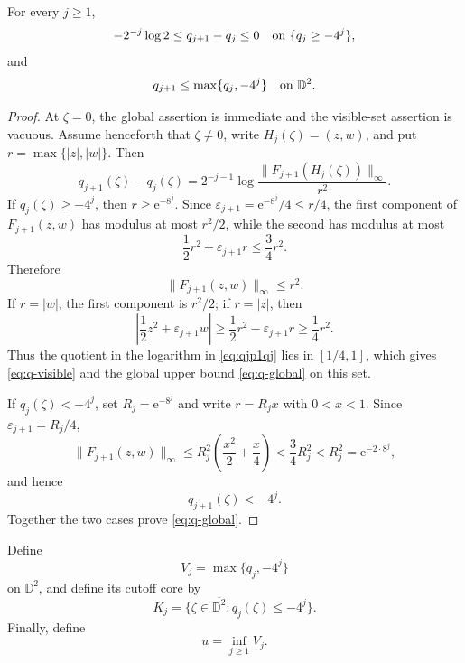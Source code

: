 \documentclass[11pt,a4paper]{article}
\newcommand{\e}{\mathrm e}
\begin{document}
\begin{lemma}
For every $j\ge 1$,
\begin{equation}\label{eq:q-visible}
  -2^{-j}\log 2 \le q_{j+1}-q_j \le 0 \quad\textup{on }\{q_j\ge-4^j\},
\end{equation}
and
\begin{equation}\label{eq:q-global}
  q_{j+1}\le\max\{q_j,-4^j\} \quad\textup{on }\mathbb D^2.
\end{equation}
\end{lemma}

\begin{proof}
At $\zeta=0$, the global assertion is immediate and the visible-set assertion is vacuous. Assume henceforth that $\zeta\ne0$, write $H_j(\zeta)=(z,w)$, and put $r=\max\{|z|,|w|\}$. Then
\begin{equation}\label{eq:qjp1qj}
  q_{j+1}(\zeta)-q_j(\zeta)=2^{-j-1} \log\frac{\|F_{j+1}(H_j(\zeta))\|_\infty}{r^2}.
\end{equation}
If $q_j(\zeta)\ge-4^j$, then $r\ge \e^{-8^j}$. Since $\varepsilon_{j+1}=\e^{-8^j}/4\le r/4$, the first component of $F_{j+1}(z,w)$ has modulus at most $r^2/2$, while the second has modulus at most
\[
  \frac{1}{2}r^2+\varepsilon_{j+1}r
  \le\frac{3}{4}r^2.
\]
Therefore
\[
  \|F_{j+1}(z,w)\|_\infty\le r^2.
\]
If $r=|w|$, the first component is $r^2/2$; if $r=|z|$, then
\[
  \left|\frac{1}{2}z^2+\varepsilon_{j+1}w\right|
  \ge\frac{1}{2}r^2-\varepsilon_{j+1}r
  \ge\frac{1}{4}r^2.
\]
Thus the quotient in the logarithm in \eqref{eq:qjp1qj} lies in $[1/4,1]$, which gives \eqref{eq:q-visible} and the global upper bound \eqref{eq:q-global} on this set.

If $q_j(\zeta)<-4^j$, set $R_j=\e^{-8^j}$ and write $r=R_j x$ with $0<x<1$. Since $\varepsilon_{j+1}=R_j/4$,
\[
  \|F_{j+1}(z,w)\|_\infty
  \le R_j^2\left(\frac{x^2}{2}+\frac{x}{4}\right)
  <\frac{3}{4}R_j^2
  <R_j^2=\e^{-2\cdot8^j},
\]
and hence
\[
  q_{j+1}(\zeta)
  <-4^j.
\]
Together the two cases prove \eqref{eq:q-global}.
\end{proof}

Define
\begin{equation}\label{eq:Vj}
  V_j=\max\{q_j,-4^j\}
\end{equation}
on $\mathbb D^2$, and define its cutoff core by
\[
  K_j=\{\zeta\in\overline{\mathbb D^2}:q_j(\zeta)\le-4^j\}.
\]
Finally, define
\begin{equation}\label{eq:u}
  u=\inf_{j\ge1}V_j.
\end{equation}
\end{document}
